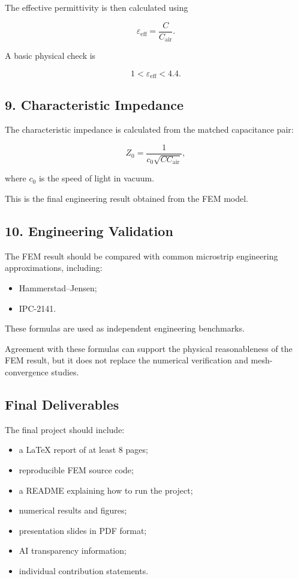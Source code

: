 The effective permittivity is then calculated using

\[
\varepsilon_{\mathrm{eff}}
=
\frac{C}{C_{\mathrm{air}}}.
\]

A basic physical check is

\[
1
<
\varepsilon_{\mathrm{eff}}
<
4.4.
\]

\subsection*{9. Characteristic Impedance}

The characteristic impedance is calculated from the matched capacitance pair:

\[
Z_0
=
\frac{1}
{c_0 \sqrt{C C_{\mathrm{air}}}},
\]

where \(c_0\) is the speed of light in vacuum.

This is the final engineering result obtained from the FEM model.

\subsection*{10. Engineering Validation}

The FEM result should be compared with common microstrip engineering approximations, including:

\begin{itemize}
    \item Hammerstad--Jensen;
    \item IPC-2141.
\end{itemize}

These formulas are used as independent engineering benchmarks.

Agreement with these formulas can support the physical reasonableness of the FEM result, but it does not replace the numerical verification and mesh-convergence studies.

\subsection*{Final Deliverables}

The final project should include:

\begin{itemize}
    \item a LaTeX report of at least 8 pages;
    \item reproducible FEM source code;
    \item a README explaining how to run the project;
    \item numerical results and figures;
    \item presentation slides in PDF format;
    \item AI transparency information;
    \item individual contribution statements.
\end{itemize}

